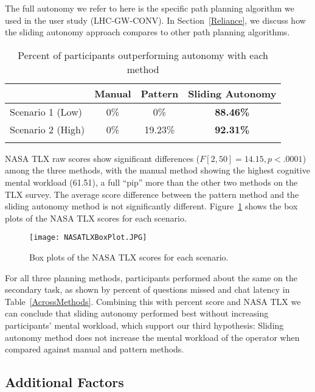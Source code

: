 The full autonomy we refer to here is the specific path planning algorithm we used in the user study (LHC-GW-CONV). In Section~\ref{Reliance}, we discuss how the sliding autonomy approach compares to other path planning algorithms.

\begin{table}
\caption{Percent of participants outperforming autonomy with each method}
	\centering
		\begin{tabular}
			{|l|c|c|c|}
			\hline
			 & Manual & Pattern & Sliding Autonomy \\
			\hline
			Scenario 1 (Low) & 0\% & 0\% & \textbf{88.46\%} \\
			\hline
			Scenario 2 (High) & 0\% & 19.23\% & \textbf{92.31\%} \\
			\hline			
			\multicolumn{4}{c}{}  %
		\end{tabular}
\label{CompareToFullAutonomy}
\end{table}

NASA TLX raw scores show significant differences ($F[2,50]=14.15, p<.0001$) among the three methods, with the manual method showing the highest cognitive mental workload (61.51), a full ``pip'' more than the other two methods on the TLX survey. The average score difference between the pattern method and the sliding autonomy method is not significantly different. Figure~\ref{NASATLX} shows the box plots of the NASA TLX scores for each scenario.

\begin{figure}
\centering
\texttt{[image: NASATLXBoxPlot.JPG]}
\caption{Box plots of the NASA TLX scores for each scenario.}
\label{NASATLX}
\end{figure}

For all three planning methods, participants performed about the same on the secondary task, as shown by percent of questions missed and chat latency in Table~\ref{AcrossMethods}. Combining this with percent score and NASA TLX we can conclude that sliding autonomy performed best without increasing participants' mental workload, which support our third hypothesis: Sliding autonomy method does not increase the mental workload of the operator when compared against manual and pattern methods.

\subsection{Additional Factors}

